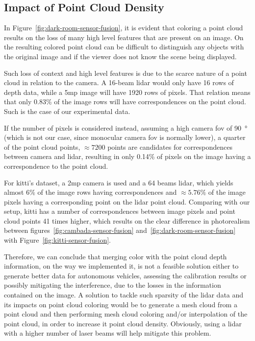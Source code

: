 \subsection{Impact of Point Cloud Density}
In Figure~\ref{fig:dark-room-sensor-fusion}, it is evident that coloring a point cloud results on the loss of many high level features that are present on an image. On the resulting colored point cloud can be difficult to distinguish any objects with the original image and if the viewer does not know the scene being displayed.

Such loss of context and high level features is due to the scarce nature of a point cloud in relation to the camera. A 16-beam \ac{lidar} would only have 16 rows of depth data, while a 5\ac{mp} image will have 1920 rows of pixels. That relation means that only 0.83\% of the image rows will have correspondences on the point cloud. Such is the case of our experimental data.

If the number of pixels is considered instead, assuming a high camera \ac{fov} of \SI{90}{\degree} (which is not our case, since monocular camera \ac{fov} is normally lower), a quarter of the point cloud points, $\approx 7200$ points are candidates for correspondences between camera and \ac{lidar}, resulting in only 0.14\% of pixels on the image having a correspondence to the point cloud. 

For \ac{kitti}'s dataset, a 2\ac{mp} camera is used and a 64 beams \ac{lidar}, which yields almost 6\% of the image rows having correspondences and $\approx 5.76\%$ of the image pixels having a corresponding point on the \ac{lidar} point cloud. Comparing with our setup, \ac{kitti} has a number of correspondences between image pixels and point cloud points 41 times higher, which results on the clear difference in photorealism between figures~\ref{fig:cambada-sensor-fusion} and~\ref{fig:dark-room-sensor-fusion} with Figure~\ref{fig:kitti-sensor-fusion}.

Therefore, we can conclude that merging color with the point cloud depth information, on the way we implemented it, is not a feasible solution either to generate better data for autonomous vehicles, assessing the calibration results or possibly mitigating the interference, due to the losses in the information contained on the image. A solution to tackle such sparsity of the \ac{lidar} data and its impacts on point cloud coloring would be to generate a mesh cloud  from a point cloud and then performing mesh cloud coloring and/or interpolation of the point cloud, in order to increase it point cloud density. Obviously, using a \ac{lidar} with a higher number of laser beams will help mitigate this problem.

